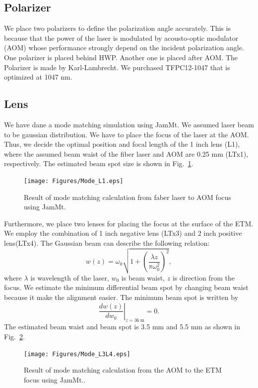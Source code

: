 \subsection{Polarizer}
We place two polarizers to define the polarization angle accurately. This is because that the power of the laser is modulated by acousto-optic modulator (AOM) whose performance strongly depend on the incident polarization angle.
One polarizer is placed behind HWP. Another one is placed after AOM. The Polarizer is made by Karl-Lambrecht. We purchased TFPC12-1047 that is optimized at 1047 nm. 

\subsection{Lens}
We have dane a mode matching simulation using JamMt. We assumed laser beam to be gaussian distribution. We have to place the focus of the laser at the AOM. Thus, we decide the optimal position and focal length of the 1 inch lens (L1), where the assumed beam waist of the fiber laser and AOM are 0.25 mm (LTx1), respectively. The estimated beam spot size is shown in Fig.~\ref{fig:Mode_L1}.
\begin{figure}
\begin{center}
\texttt{[image: Figures/Mode\_L1.eps]}
\caption{Result of mode matching calculation from faber laser to AOM focus using JamMt.} 
\label{fig:Mode_L1} 
\end{center}
\end{figure}

Furthermore, we place two lenses for placing the focus at the surface of the ETM. We employ the combination of 1 inch negative lens (LTx3) and 2 inch positive lens(LTx4). The Gaussian beam can describe the following relation:
\begin{equation}
w(z)=\omega_0\sqrt{1+\left( \frac{\lambda z}{\pi \omega_0^2}\right)^2},
\end{equation}
where $\lambda$ is wavelength of the laser, $w_0$ is beam waist, $z$ is direction from the focus. We estimate the minimum differential beam spot by changing beam waist because it make the alignment easier. The minimum beam spot is written by 
\begin{equation}
\left .\frac{dw(z)}{dw_0} \right|_{z=36~\mathrm{m}}=0.
\end{equation}
The estimated beam waist and beam spot is 3.5 mm and 5.5 mm as shown in Fig.~\ref{fig:Mode_L3L4}.
\begin{figure}
\begin{center}
\texttt{[image: Figures/Mode\_L3L4.eps]}
\caption{Result of mode matching calculation from the AOM to the ETM focus using JamMt..} 
\label{fig:Mode_L3L4} 
\end{center}
\end{figure}

